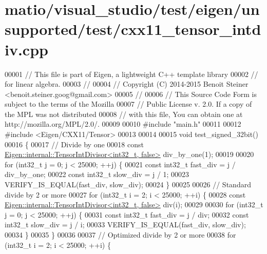 \hypertarget{matio_2visual__studio_2test_2eigen_2unsupported_2test_2cxx11__tensor__intdiv_8cpp_source}{}\section{matio/visual\+\_\+studio/test/eigen/unsupported/test/cxx11\+\_\+tensor\+\_\+intdiv.cpp}
\label{matio_2visual__studio_2test_2eigen_2unsupported_2test_2cxx11__tensor__intdiv_8cpp_source}

\begin{DoxyCode}
00001 \textcolor{comment}{// This file is part of Eigen, a lightweight C++ template library}
00002 \textcolor{comment}{// for linear algebra.}
00003 \textcolor{comment}{//}
00004 \textcolor{comment}{// Copyright (C) 2014-2015 Benoit Steiner <benoit.steiner.goog@gmail.com>}
00005 \textcolor{comment}{//}
00006 \textcolor{comment}{// This Source Code Form is subject to the terms of the Mozilla}
00007 \textcolor{comment}{// Public License v. 2.0. If a copy of the MPL was not distributed}
00008 \textcolor{comment}{// with this file, You can obtain one at http://mozilla.org/MPL/2.0/.}
00009 
00010 \textcolor{preprocessor}{#include "main.h"}
00011 
00012 \textcolor{preprocessor}{#include <Eigen/CXX11/Tensor>}
00013 
00014 
00015 \textcolor{keywordtype}{void} test\_signed\_32bit()
00016 \{
00017   \textcolor{comment}{// Divide by one}
00018   \textcolor{keyword}{const} \hyperlink{struct_eigen_1_1internal_1_1_tensor_int_divisor}{Eigen::internal::TensorIntDivisor<int32\_t, false>} 
      div\_by\_one(1);
00019 
00020   \textcolor{keywordflow}{for} (int32\_t j = 0; j < 25000; ++j) \{
00021     \textcolor{keyword}{const} int32\_t fast\_div = j / div\_by\_one;
00022     \textcolor{keyword}{const} int32\_t slow\_div = j / 1;
00023     VERIFY\_IS\_EQUAL(fast\_div, slow\_div);
00024   \}
00025 
00026   \textcolor{comment}{// Standard divide by 2 or more}
00027   \textcolor{keywordflow}{for} (int32\_t i = 2; i < 25000; ++i) \{
00028     \textcolor{keyword}{const} \hyperlink{struct_eigen_1_1internal_1_1_tensor_int_divisor}{Eigen::internal::TensorIntDivisor<int32\_t, false>}
       div(i);
00029 
00030     \textcolor{keywordflow}{for} (int32\_t j = 0; j < 25000; ++j) \{
00031       \textcolor{keyword}{const} int32\_t fast\_div = j / div;
00032       \textcolor{keyword}{const} int32\_t slow\_div = j / i;
00033       VERIFY\_IS\_EQUAL(fast\_div, slow\_div);
00034     \}
00035   \}
00036 
00037   \textcolor{comment}{// Optimized divide by 2 or more}
00038   \textcolor{keywordflow}{for} (int32\_t i = 2; i < 25000; ++i) \{

\end{DoxyCode}
